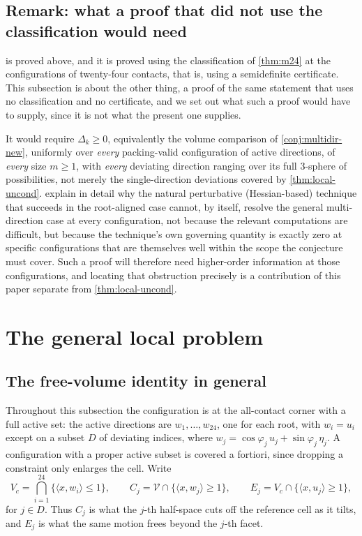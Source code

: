 \documentclass[11pt,reqno]{amsart}
\renewcommand{\_}{\origunderscore\allowbreak}
\numberwithin{equation}{section}
\theoremstyle{plain}
\theoremstyle{definition}
\theoremstyle{remark}
\newcommand{\VCell}{\mathcal{V}}             %
\newcommand{\tilt}{\varphi}                  %
\newcommand{\dev}{\eta}                      %
\newcommand{\defect}{\Delta}                 %
\newcommand{\base}{u}                        %
\begin{document}
\subsection{Remark: what a proof that did not use the classification would need}\label{rem:what-would-close-new}

 is proved above, and it is proved using the
classification of \cref{thm:m24} at the configurations of twenty-four
contacts, that is, using a semidefinite certificate. This subsection is
about the other thing, a proof of the same statement that uses no
classification and no certificate, and we set out what such a proof
would have to supply, since it is not what the present one supplies.

It would require
$\defect_k\ge0$, equivalently the volume comparison of
\cref{conj:multidir-new}, uniformly over
\emph{every} packing-valid configuration of active directions, of
\emph{every} size $m\ge1$, with \emph{every} deviating direction ranging
over its full $3$-sphere of possibilities, not merely the
single-direction deviations covered by \cref{thm:local-uncond}.  explain in detail why the natural
perturbative (Hessian-based) technique that succeeds in the
root-aligned case cannot, by itself, resolve the general
multi-direction case at every configuration, not because the relevant
computations are difficult, but because the technique's own governing
quantity is exactly zero at specific configurations that are
themselves well within the scope the conjecture must cover. Such a proof
will therefore need higher-order information at those configurations,
and locating that obstruction precisely is a contribution of this paper
separate from \cref{thm:local-uncond}.
\section{The general local problem}\label{sec:deviation-domain}

\subsection{The free-volume identity in general}

Throughout this subsection the configuration is at the all-contact
corner with a full active set: the active directions are
$w_1,\dots,w_{24}$, one for each root, with $w_i=\base_i$ except on a
subset $D$ of deviating indices, where $w_j=\cos\tilt_j\,\base_j+\sin\tilt_j\,\dev_j$.
A configuration with a proper active subset is covered a fortiori, since
dropping a constraint only enlarges the cell. Write
\[
  V_c=\bigcap_{i=1}^{24}\{\langle x,w_i\rangle\le1\},
  \qquad
  C_j=\VCell\cap\{\langle x,w_j\rangle\ge1\},
  \qquad
  E_j=V_c\cap\{\langle x,\base_j\rangle\ge1\},
\]
for $j\in D$. Thus $C_j$ is what the $j$-th half-space cuts off the
reference cell as it tilts, and $E_j$ is what the same motion frees
beyond the $j$-th facet.
\end{document}
